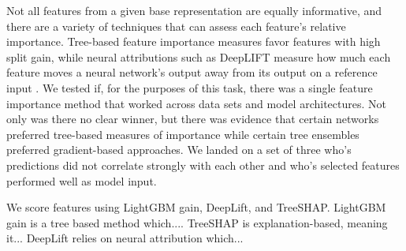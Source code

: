 

Not all features from a given base representation are equally informative, and there are a variety of techniques that can assess each feature's relative importance. Tree-based feature importance measures favor features with high split gain, while neural attributions such as DeepLIFT measure how much each feature moves a neural network's output away from its output on a reference input \citep{Strobl2007, Ancona2018}.
We tested if, for the purposes of this task, there was a single feature importance method that worked across data sets and model architectures. Not only was there no clear winner, but there was evidence that certain networks preferred tree-based measures of importance while certain tree ensembles preferred gradient-based approaches. We landed on a set of three who's predictions did not correlate strongly with each other and who's selected features performed well as model input.

We score features using LightGBM gain, DeepLift, and TreeSHAP. LightGBM gain is a tree based method which.... TreeSHAP is explanation-based, meaning it... DeepLift relies on neural attribution which...

